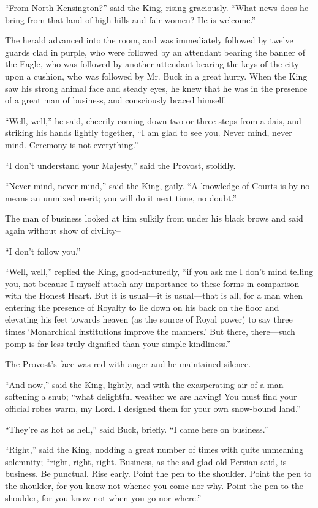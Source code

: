 \documentclass{book}
\begin{document}
“From North Kensington?” said the King, rising graciously. “What news does he bring from that land of high hills and fair women? He is welcome.”

The herald advanced into the room, and was immediately followed by twelve guards clad in purple, who were followed by an attendant bearing the banner of the Eagle, who was followed by another attendant bearing the keys of the city upon a cushion, who was followed by Mr. Buck in a great hurry. When the King saw his strong animal face and steady eyes, he knew that he was in the presence of a great man of business, and consciously braced himself.

“Well, well,” he said, cheerily coming down two or three steps from a dais, and striking his hands lightly together, “I am glad to see you. Never mind, never mind. Ceremony is not everything.”

“I don’t understand your Majesty,” said the Provost, stolidly.

“Never mind, never mind,” said the King, gaily. “A knowledge of Courts is by no means an unmixed merit; you will do it next time, no doubt.”

The man of business looked at him sulkily from under his black brows and said again without show of civility–

“I don’t follow you.”

“Well, well,” replied the King, good-naturedly, “if you ask me I don’t mind telling you, not because I myself attach any importance to these forms in comparison with the Honest Heart. But it is usual—it is usual—that is all, for a man when entering the presence of Royalty to lie down on his back on the floor and elevating his feet towards heaven (as the source of Royal power) to say three times ‘Monarchical institutions improve the manners.’ But there, there—such pomp is far less truly dignified than your simple kindliness.”

The Provost’s face was red with anger and he maintained silence.

“And now,” said the King, lightly, and with the exasperating air of a man softening a snub; “what delightful weather we are having! You must find your official robes warm, my Lord. I designed them for your own snow-bound land.”

“They’re as hot as hell,” said Buck, briefly. “I came here on business.”

“Right,” said the King, nodding a great number of times with quite unmeaning solemnity; “right, right, right. Business, as the sad glad old Persian said, is business. Be punctual. Rise early. Point the pen to the shoulder. Point the pen to the shoulder, for you know not whence you come nor why. Point the pen to the shoulder, for you know not when you go nor where.”
\end{document}
